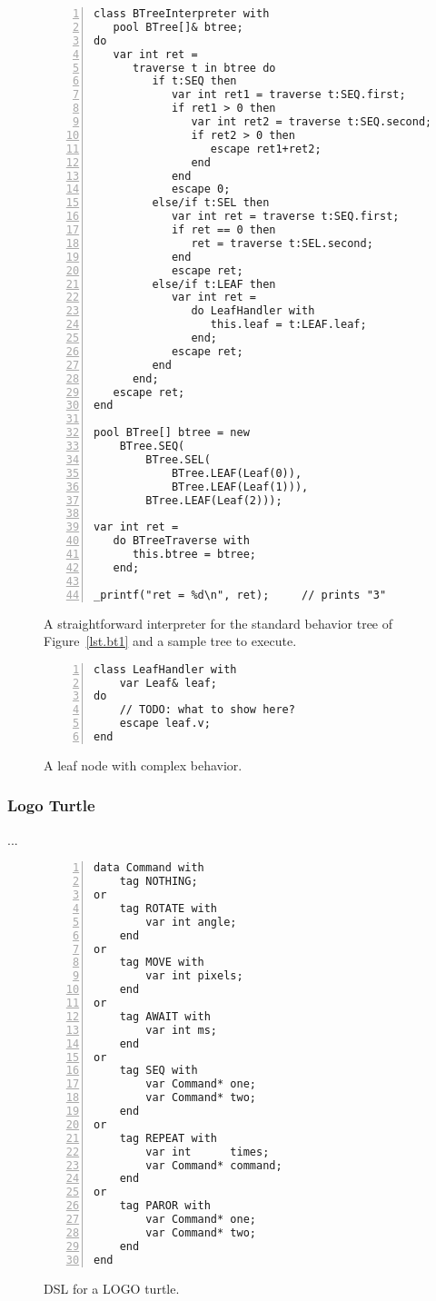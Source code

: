 \documentclass{acm_proc_article-sp}
\begin{document}
\begin{figure}%
\begin{lstlisting}[numbers=left,xleftmargin=3em]
class BTreeInterpreter with
   pool BTree[]& btree;
do
   var int ret =
      traverse t in btree do
         if t:SEQ then
            var int ret1 = traverse t:SEQ.first;
            if ret1 > 0 then
               var int ret2 = traverse t:SEQ.second;
               if ret2 > 0 then
                  escape ret1+ret2;
               end
            end
            escape 0;
         else/if t:SEL then
            var int ret = traverse t:SEQ.first;
            if ret == 0 then
               ret = traverse t:SEL.second;
            end
            escape ret;
         else/if t:LEAF then
            var int ret =
               do LeafHandler with
                  this.leaf = t:LEAF.leaf;
               end;
            escape ret;
         end
      end;
   escape ret;
end

pool BTree[] btree = new
    BTree.SEQ(
        BTree.SEL(
            BTree.LEAF(Leaf(0)),
            BTree.LEAF(Leaf(1))),
        BTree.LEAF(Leaf(2)));

var int ret =
   do BTreeTraverse with
      this.btree = btree;
   end;

_printf("ret = %d\n", ret);     // prints "3"
\end{lstlisting}
\caption{ A straightforward interpreter for the standard behavior tree of 
          Figure~\ref{lst.bt1} and a sample tree to execute.
\label{lst.bt1.interpreter}
}
\end{figure}

\begin{figure}%
\begin{lstlisting}[numbers=left,xleftmargin=3em]
class LeafHandler with
    var Leaf& leaf;
do
    // TODO: what to show here?
    escape leaf.v;
end
\end{lstlisting}
\caption{ A leaf node with complex behavior.
\label{lst.bt1.leaf}
}
\end{figure}

\subsubsection{Logo Turtle}

...

\begin{figure}%
\begin{lstlisting}[numbers=left,xleftmargin=3em]
data Command with
    tag NOTHING;
or
    tag ROTATE with
        var int angle;
    end
or
    tag MOVE with
        var int pixels;
    end
or
    tag AWAIT with
        var int ms;
    end
or
    tag SEQ with
        var Command* one;
        var Command* two;
    end
or
    tag REPEAT with
        var int      times;
        var Command* command;
    end
or
    tag PAROR with
        var Command* one;
        var Command* two;
    end
end
\end{lstlisting}
\caption{ DSL for a LOGO turtle.
\label{lst.turtle.dsl}
}
\end{figure}
\end{document}
